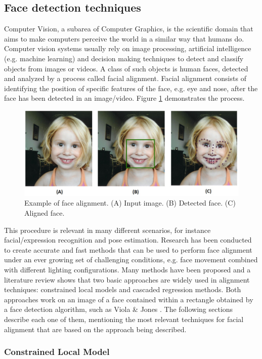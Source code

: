 \subsection{Face detection techniques}
Computer Vision, a subarea of Computer Graphics, is the scientific domain that aims to make computers perceive the world in a similar way that humans do. Computer vision systems usually rely on image processing, artificial intelligence (e.g. machine learning) and decision making techniques to detect and classify objects from images or videos. A class of such objects is human faces, detected and analyzed by a process called facial alignment. Facial alignment consists of identifying the position of specific features of the face, e.g. eye and nose, after the face has been detected in an image/video. Figure \ref{fig:alignment} demonstrates the process.

\begin{figure}[ht]
    \centering
    \includegraphics[width=0.8\linewidth]{figures/face_alignment.jpg}
    \caption{Example of face alignment. (A) Input image. (B) Detected face. (C) Aligned face.}
    \label{fig:alignment}
\end{figure}

This procedure is relevant in many different scenarios, for instance facial/expression recognition and pose estimation. Research has been conducted to create accurate and fast methods that can be used to perform face alignment under an ever growing set of challenging conditions, e.g. face movement combined with different lighting configurations. Many methods have been proposed and a literature review shows that two basic approaches are widely used in alignment techniques: constrained local models and cascaded regression methods. Both approaches work on an image of a face contained within a rectangle obtained by a face detection algorithm, such as Viola \& Jones \parencite{viola2004robust}. The following sections describe each one of them, mentioning the most relevant techniques for facial alignment that are based on the approach being described.

\subsubsection{Constrained Local Model}

